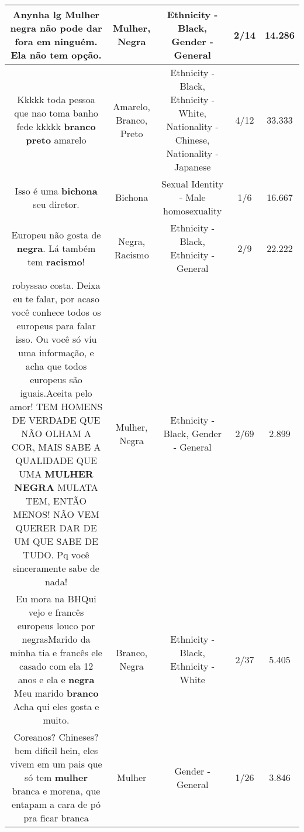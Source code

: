 \documentclass[11pt]{article}
\newlength\mylength
\begin{document}
\begin{center}
\begin{longtable}{|C{.65\mylength}|C{.30\mylength}|C{.12\mylength}|C{.12\mylength}|C{.12\mylength}|}
  \small Anynha lg \textbf{Mulher} \textbf{negra} não pode dar fora em ninguém.  Ela não tem opção.\normalsize   & Mulher, Negra & Ethnicity - Black, Gender - General & 2/14 & 14.286 \\  \hline
  \small Kkkkk toda pessoa que nao toma banho fede kkkkk \textbf{branco} \textbf{preto} amarelo\normalsize   & Amarelo, Branco, Preto & Ethnicity - Black, Ethnicity - White, Nationality - Chinese, Nationality - Japanese & 4/12 & 33.333 \\  \hline
  \small Isso é uma \textbf{bichona} seu diretor.\normalsize   & Bichona & Sexual Identity - Male homosexuality & 1/6 & 16.667 \\  \hline
  \small Europeu não gosta de \textbf{negra}.  Lá também tem \textbf{racismo}!\normalsize   & Negra, Racismo & Ethnicity - Black, Ethnicity - General & 2/9 & 22.222 \\  \hline
  \small robyssao costa. Deixa eu te falar, por acaso você conhece todos os europeus para falar isso. Ou você só viu uma informação, e acha que todos europeus são iguais.Aceita pelo amor! TEM HOMENS DE VERDADE QUE NÃO OLHAM A COR, MAIS SABE A QUALIDADE QUE UMA \textbf{MULHER} \textbf{NEGRA} MULATA TEM, ENTÃO MENOS! NÃO VEM QUERER DAR DE UM QUE SABE DE TUDO. Pq você sinceramente sabe de nada!\normalsize   & Mulher, Negra & Ethnicity - Black, Gender - General & 2/69 & 2.899 \\  \hline
  \small Eu mora na BHQui vejo e francês europeus louco por negrasMarido da minha tia e francês ele casado com ela 12 anos  e ela e \textbf{negra} Meu marido \textbf{branco} Acha qui  eles gosta e muito.\normalsize   & Branco, Negra & Ethnicity - Black, Ethnicity - White & 2/37 & 5.405 \\  \hline
  \small Coreanos? Chineses? bem dificil hein, eles vivem em um pais que só tem \textbf{mulher}  branca e  morena, que entapam a cara de pó pra ficar branca\normalsize   & Mulher & Gender - General & 1/26 & 3.846 \\  \hline

\end{longtable}
\end{center}
\end{document}
